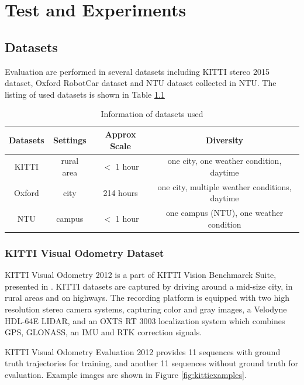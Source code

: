 
\chapter{Test and Experiments}

\section{Datasets}

Evaluation are performed in several datasets including KITTI stereo 2015 dataset\cite{Menze2015CVPR},  Oxford RobotCar dataset\cite{maddern20171} and NTU dataset collected in NTU. The listing of used datasets is shown in Table \ref{tbl:datasetsinfo}


\begin{table}
	\centering
	\caption{Information of datasets used }
	\begin{tabular}{|c|c|c|c|}
		\hline
		Datasets & Settings & Approx Scale & Diversity \\
		\hline
		KITTI &  rural area & $<$ 1 hour & one city, one weather condition, daytime \\
		\hline
		Oxford &  city & 214 hours & one city, multiple weather conditions, daytime \\
		\hline
		NTU &  campus & $<$ 1 hour & one campus (NTU), one weather condition \\
		\hline
	\end{tabular}
	\label{tbl:datasetsinfo}
\end{table}

\subsection{KITTI Visual Odometry Dataset}

KITTI Visual Odometry 2012 is a part of KITTI Vision Benchmarck Suite, presented in \cite{Geiger2012CVPR,Menze2015CVPR}. KITTI datasets are captured by driving around a mid-size city, in rural areas and on highways. The recording platform is equipped with two high resolution stereo camera systems, capturing color and gray images, a Velodyne HDL-64E LIDAR, and an OXTS RT 3003 localization system which combines GPS, GLONASS, an IMU and RTK correction signals.

KITTI Visual Odometry Evaluation 2012 provides 11 sequences with ground truth trajectories for training, and another 11 sequences without ground truth for evaluation. Example images are shown in Figure \ref{fig:kittiexamples}. 


